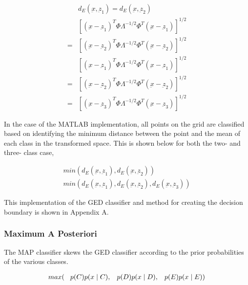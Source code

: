 \begin{eqnarray}
\label{eqn:boundary-GED}
& d_{E} (\underbar{x},\underbar{z}_{1}) = d_{E} (\underbar{x},\underbar{z}_{2}) \\
& \left [ (\underbar{x}-\underbar{z}_{1})^{T}\Phi\Lambda^{-1/2}\Phi^{T}(\underbar{x}-\underbar{z}_{1}) \right ]^{1/2} \\
= & \left [ (\underbar{x}-\underbar{z}_{2})^{T}\Phi\Lambda^{-1/2}\Phi^{T}(\underbar{x}-\underbar{z}_{2}) \right ]^{1/2}  \nonumber \\
&\left [ (\underbar{x}-\underbar{z}_{1})^{T}\Phi\Lambda^{-1/2}\Phi^{T}(\underbar{x}-\underbar{z}_{1}) \right ]^{1/2} \\
= &\left [ (\underbar{x}-\underbar{z}_{2})^{T}\Phi\Lambda^{-1/2}\Phi^{T}(\underbar{x}-\underbar{z}_{2}) \right ]^{1/2}  \nonumber \\
= &\left [ (\underbar{x}-\underbar{z}_{3})^{T}\Phi\Lambda^{-1/2}\Phi^{T}(\underbar{x}-\underbar{z}_{3}) \right ]^{1/2}  \nonumber
\end{eqnarray}



In the case of the MATLAB implementation, all points on the grid are classified based on identifying the minimum distance between the point and the mean of each class in the transformed space. This is shown below for both the two- and three- class case,

\begin{eqnarray}
\label{eqn:pointClass-GED}
min(d_{E} (\underbar{x},\underbar{z}_{1}), d_{E} (\underbar{x},\underbar{z}_{2})) \\
min(d_{E} (\underbar{x},\underbar{z}_{1}), d_{E} (\underbar{x},\underbar{z}_{2}), d_{E} (\underbar{x},\underbar{z}_{3}))
\end{eqnarray}


This implementation of the GED classifier and method for creating the decision boundary is shown in Appendix A.

\subsubsection{Maximum A Posteriori}

The MAP classifier skews the GED classifier according to the prior probabilities of the various classes.

\begin{eqnarray}
max( \hspace{3mm} p(C)p(x\mid C), \hspace{3mm} p(D)p(x\mid D), \hspace{3mm} p(E)p(x\mid E) ) 
\end{eqnarray}


